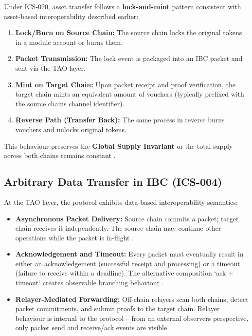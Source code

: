 Under ICS-020, asset transfer follows a \textbf{lock-and-mint} pattern
consistent with asset-based interoperability described earlier:

\begin{enumerate}
\tightlist
\item
  \textbf{Lock/Burn on Source Chain:} The source chain locks the
  original tokens in a module account or burns them.
\item
  \textbf{Packet Transmission:} The lock event is packaged into an IBC
  packet and sent via the TAO layer.
\item
  \textbf{Mint on Target Chain:} Upon packet receipt and proof
  verification, the target chain mints an equivalent amount of vouchers
  (typically prefixed with the source chain\textquotesingle s channel
  identifier).
\item
  \textbf{Reverse Path (Transfer Back):} The same process in reverse
  burns vouchers and unlocks original tokens.
\end{enumerate}

This behaviour preserves the \textbf{Global Supply Invariant} or the
total supply across both chains remains constant \citep{Pillai_2022}
\citep{Li_2023}.

\subsection{Arbitrary Data Transfer in IBC
(ICS-004)}\label{arbitrary-data-transfer-in-ibc-ics-004}

At the TAO layer, the protocol exhibits data-based interoperability
semantics:

\begin{itemize}
\tightlist
\item
  \textbf{Asynchronous Packet Delivery:} Source chain commits a packet;
  target chain receives it independently. The source chain may continue
  other operations while the packet is in-flight
  \citep{lu2024atomicity}.
\item
  \textbf{Acknowledgement and Timeout:} Every packet must eventually
  result in either an acknowledgement (successful receipt and
  processing) or a timeout (failure to receive within a deadline). The
  alternative composition `ack + timeout` creates observable branching
  behaviour \citep{Chervinski_2023} \citep{Wei_2023}.
\item
  \textbf{Relayer-Mediated Forwarding:} Off-chain relayers scan both
  chains, detect packet commitments, and submit proofs to the target
  chain. Relayer behaviour is internal to the protocol -- from an
  external observer\textquotesingle s perspective, only packet send and
  receive/ack events are visible \citep{Delgado_von_Eitzen_2025}.
\end{itemize}

